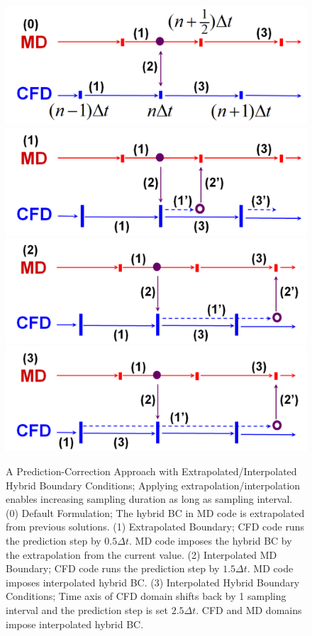 \documentclass[preprint,12pt]{elsarticle}
\begin{document}
\begin{figure}
\centering
\includegraphics[width=0.7\linewidth]{Prediction_Correction_Org.pdf}
\includegraphics[width=0.7\linewidth]{Prediction_Correction_Extra_Simple.pdf}
\includegraphics[width=0.7\linewidth]{Prediction_Correction_Inter_Simple.pdf}
\includegraphics[width=0.7\linewidth]{Prediction_Correction_Both_Simple.pdf}
\caption{\small A Prediction-Correction Approach with Extrapolated/Interpolated Hybrid Boundary Conditions; Applying extrapolation/interpolation enables increasing sampling duration as long as sampling interval. (0) Default Formulation;
The hybrid BC in MD code is extrapolated from previous solutions.
(1) Extrapolated Boundary; CFD code runs the prediction step by $0.5{\Delta}t$. MD code imposes the hybrid BC by the extrapolation from the current value. (2) Interpolated MD Boundary; CFD code runs the prediction step by $1.5{\Delta}t$. MD code imposes interpolated hybrid BC. (3) Interpolated Hybrid Boundary Conditions; Time axis of CFD domain shifts back by 1 sampling interval and the prediction step is set $2.5{\Delta}t$. CFD and MD domains impose interpolated hybrid BC.}
\label{Hybrid_Timescale2}
\end{figure}
\end{document}
